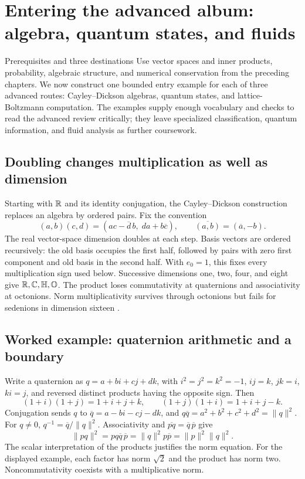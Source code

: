 \chapter{Entering the advanced album: algebra, quantum states, and fluids}
\label{learn:advanced}

\begin{learningcard}{Prerequisites and three destinations}
Use vector spaces and inner products, probability, algebraic structure, and
numerical conservation from the preceding chapters. We now construct one
bounded entry example for each of three advanced routes: Cayley--Dickson
algebras, quantum states, and lattice-Boltzmann computation. The examples
supply enough vocabulary and checks to read the advanced review critically;
they leave specialized classification, quantum information, and fluid
analysis as further coursework.
\end{learningcard}

\section{Doubling changes multiplication as well as dimension}
\label{learn:hypercomplex}

Starting with $\mathbb{R}$ and its identity conjugation, the Cayley--Dickson
construction replaces an algebra by ordered pairs. Fix the convention
\[
 (a,b)(c,d)=(ac-\overline d\,b,\;da+b\overline c),
 \qquad \overline{(a,b)}=(\overline a,-b).
\]
The real vector-space dimension doubles at each step. Basis vectors are
ordered recursively: the old basis occupies the first half, followed by
pairs with zero first component and old basis in the second half. With
$e_0=1$, this fixes every multiplication sign used below.
Successive dimensions one, two, four, and eight give
$\mathbb{R},\mathbb{C},\mathbb{H},\mathbb{O}$. The product loses commutativity at quaternions and
associativity at octonions. Norm multiplicativity survives through octonions
but fails for sedenions in dimension sixteen \citep{baez2001octonions}.

\section{Worked example: quaternion arithmetic and a boundary}
Write a quaternion as $q=a+bi+cj+dk$, with
$i^2=j^2=k^2=-1$, $ij=k$, $jk=i$, $ki=j$, and reversed distinct products
having the opposite sign. Then
\[
 (1+i)(1+j)=1+i+j+k,\qquad
 (1+j)(1+i)=1+i+j-k.
\]
Conjugation sends $q$ to $\overline q=a-bi-cj-dk$, and
$q\overline q=a^2+b^2+c^2+d^2=\|q\|^2$. For $q\ne0$,
$q^{-1}=\overline q/\|q\|^2$. Associativity and
$\overline{pq}=\overline q\,\overline p$ give
\[
 \|pq\|^2=pq\overline q\,\overline p
 =\|q\|^2p\overline p=\|p\|^2\|q\|^2.
\]
The scalar interpretation of the products justifies the norm equation.
For the displayed example, each factor has norm $\sqrt2$ and the product
has norm two. Noncommutativity coexists with a multiplicative norm.

